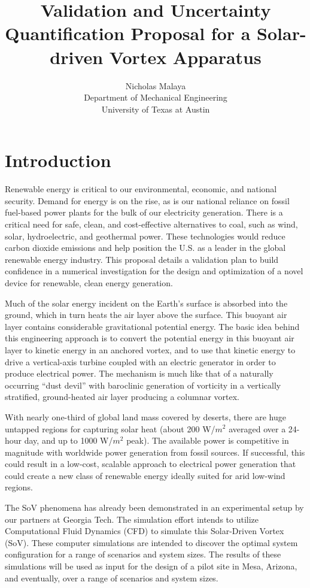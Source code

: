 \documentclass{article}
\title{Validation and Uncertainty Quantification Proposal for a
Solar-driven Vortex Apparatus}
\author{Nicholas Malaya\\ Department of Mechanical Engineering \\
University of Texas at Austin}
\date{}
\begin{document}
\maketitle
\newpage

\section{Introduction}


Renewable energy is critical to our environmental, economic, and
national security. Demand for energy is on the rise, as is our national
reliance on fossil fuel-based power plants for the bulk of our
electricity generation. There is a critical need for safe, clean, and
cost-effective alternatives to coal, such as wind, solar, hydroelectric,
and geothermal power\cite{arpa-e}. These technologies would reduce carbon dioxide
emissions and help position the U.S. as a leader in the global renewable
energy industry. This proposal details a validation plan to build
confidence in a numerical investigation for the design and optimization
of a novel device for renewable, clean energy generation. 

Much of the solar energy incident on the Earth's surface is absorbed
into the ground, which in turn heats the air layer above the surface.
This buoyant air layer contains considerable gravitational potential
energy. The basic idea behind this engineering approach is to convert the 
potential energy in this buoyant air layer to kinetic energy in an
anchored vortex, and to use that kinetic energy to drive a
vertical-axis turbine coupled with an electric generator in order to
produce electrical power. The mechanism is much like that of a naturally
occurring ``dust devil'' with baroclinic generation of vorticity in a
vertically stratified, ground-heated air layer producing a columnar vortex. 

With nearly one-third of global land mass covered by deserts, there are huge
untapped regions for capturing solar heat (about 200 W/$m^2$ averaged over
a 24-hour day, and up to 1000 W/$m^2$ peak).  The available power is
competitive in magnitude with worldwide power generation from fossil
sources. If successful, this could result in a low-cost, scalable
approach to electrical power generation that could create a new class of
renewable energy ideally suited for arid low-wind regions. 

The SoV phenomena has already been demonstrated in an experimental setup
by our partners at Georgia Tech. The simulation effort intends to utilize
Computational Fluid Dynamics (CFD) to simulate this Solar-Driven Vortex
(SoV). These computer simulations are intended to discover the optimal
system configuration for a range of scenarios and system sizes. The
results of these simulations will be used as input for the design of a
pilot site in Mesa, Arizona, and eventually, over a range of
scenarios and system sizes. 
\end{document}
